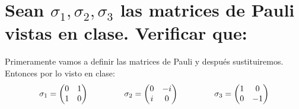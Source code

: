 \section{Sean $\sigma_1, \sigma_2, \sigma_3$ las matrices de Pauli vistas en clase. Verificar que:}

Primeramente vamos a definir las matrices de Pauli y despu\'es sustituiremos. Entonces por lo visto en clase: 
\[ \sigma_1 = \begin{pmatrix} 0 & 1 \\ 1 & 0 \end{pmatrix}\hspace{1.5cm}\sigma_2 = \begin{pmatrix} 0 & -i \\ i & 0 \end{pmatrix} \hspace{1.5cm} \sigma_3 = \begin{pmatrix} 1 & 0 \\ 0 & -1 \end{pmatrix}\]
